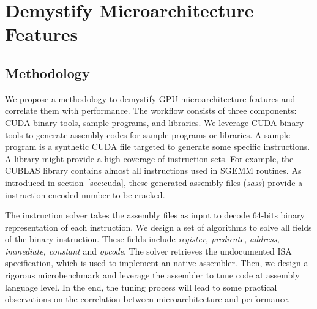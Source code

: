 \documentclass{sig-alternate-05-2015}
\begin{document}
\section{Demystify Microarchitecture Features}
\label{sec:assembler}

\subsection{Methodology}
We propose a methodology to demystify GPU microarchitecture features and correlate them with performance. The workflow consists of three components: CUDA binary tools, sample programs, and libraries. We leverage CUDA binary tools to generate assembly codes for sample programs or libraries. A sample program is a synthetic CUDA file targeted to generate some specific instructions. A library might provide a high coverage of instruction sets. For example, the CUBLAS library contains almost all instructions used in SGEMM routines. As introduced in section~\ref{sec:cuda}, these generated assembly files ({\em sass}) provide a instruction encoded number to be cracked.

The instruction solver takes the assembly files as input to decode 64-bits binary representation of each instruction. We design a set of algorithms to solve all fields of the binary instruction. These fields include {\em register, predicate, address, immediate, constant} and {\em opcode}. The solver retrieves the undocumented ISA specification, which is used to implement an native assembler. Then, we design a rigorous microbenchmark and leverage the assembler to tune code at assembly language level. In the end, the tuning process will lead to some practical observations on the correlation between microarchitecture and performance.
\end{document}
